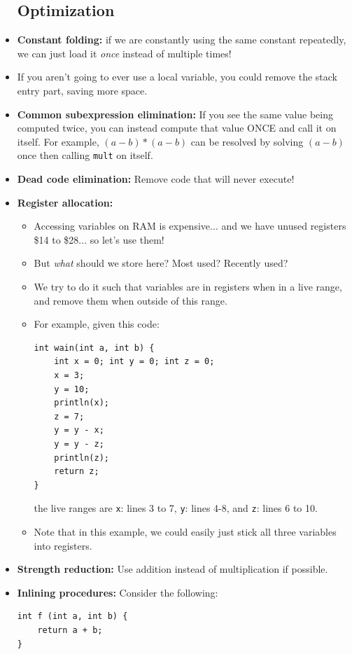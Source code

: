 \documentclass[12pt]{article}
\begin{document}
\begin{itemize}
    \subsection{Optimization}
        \item \textbf{Constant folding:} if we are constantly using the same constant repeatedly, we can just load it \emph{once} instead of multiple times!
        \item If you aren't going to ever use a local variable, you could remove the stack entry part, saving more space.
        \item \textbf{Common subexpression elimination:} If you see the same value being computed twice, you can instead compute that value ONCE and call it on itself.  For example, $(a - b) * (a-b)$ can be resolved by solving $(a-b)$ once then calling \lstinline[mathescape]{mult} on itself.
        \item \textbf{Dead code elimination:} Remove code that will never execute!  
        \item \textbf{Register allocation:}
            \begin{itemize}
                \item Accessing variables on RAM is expensive$\dots$ and we have unused registers \$14 to \$28... so let's use them!
                \item But \emph{what} should we store here?  Most used?  Recently used?
                \item We try to do it such that variables are in registers when in a live range, and remove them when outside of this range.
                \item For example, given this code:
\begin{lstlisting}[mathescape, numbers=none, breaklines=true]
int wain(int a, int b) {
    int x = 0; int y = 0; int z = 0;
    x = 3;
    y = 10;
    println(x);
    z = 7;
    y = y - x;
    y = y - z;
    println(z);
    return z;
}
\end{lstlisting}
                the live ranges are \lstinline[mathescape]{x}: lines 3 to 7, \lstinline[mathescape]{y}: lines 4-8, and \lstinline[mathescape]{z}: lines 6 to 10.
            \item Note that in this example, we could easily just stick all three variables into registers.
            \end{itemize}
        \item \textbf{Strength reduction:} Use addition instead of multiplication if possible.
        \item \textbf{Inlining procedures:} Consider the following:
\begin{lstlisting}[mathescape, numbers=none, breaklines=true]
int f (int a, int b) {
    return a + b;
}


\end{lstlisting}
\end{itemize}
\end{document}
